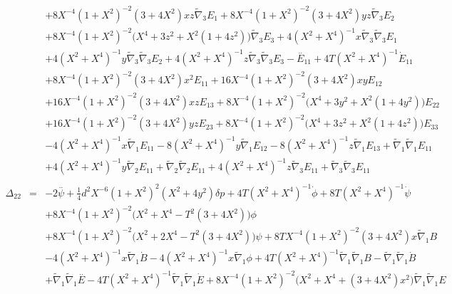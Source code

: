 \documentclass[10pt,letterpaper]{article}
\numberwithin{equation}{section}
\begin{document}
\begin{appendices}
\begin{eqnarray}
&& + 8 X^{-4} (1 + X^2)^{-2} (3 + 4 X^2) x z \tilde{\nabla}_{3}E_{1} + 8 X^{-4} (1 + X^2)^{-2} (3 + 4 X^2) y z \tilde{\nabla}_{3}E_{2} \nonumber \\ 
&& + 8 X^{-4} (1 + X^2)^{-2} \bigl(X^4 + 3 z^2 + X^2 (1 + 4 z^2)\bigr) \tilde{\nabla}_{3}E_{3} + 4 (X^2 + X^4)^{-1} x \tilde{\nabla}_{3}\tilde{\nabla}_{3}E_{1} \nonumber \\ 
&& + 4 (X^2 + X^4)^{-1} y \tilde{\nabla}_{3}\tilde{\nabla}_{3}E_{2} + 4 (X^2 + X^4)^{-1} z \tilde{\nabla}_{3}\tilde{\nabla}_{3}E_{3}- \overset{..}{E}_{11} + 4 T (X^2 + X^4)^{-1} \dot{E}_{11} \nonumber \\ 
&& + 8 X^{-4} (1 + X^2)^{-2} (3 + 4 X^2) x^2 E_{11} + 16 X^{-4} (1 + X^2)^{-2} (3 + 4 X^2) x y E_{12} \nonumber \\ 
&& + 16 X^{-4} (1 + X^2)^{-2} (3 + 4 X^2) x z E_{13} + 8 X^{-4} (1 + X^2)^{-2} \bigl(X^4 + 3 y^2 + X^2 (1 + 4 y^2)\bigr) E_{22} \nonumber \\ 
&& + 16 X^{-4} (1 + X^2)^{-2} (3 + 4 X^2) y z E_{23} + 8 X^{-4} (1 + X^2)^{-2} \bigl(X^4 + 3 z^2 + X^2 (1 + 4 z^2)\bigr) E_{33} \nonumber \\ 
&& - 4 (X^2 + X^4)^{-1} x \tilde{\nabla}_{1}E_{11} - 8 (X^2 + X^4)^{-1} y \tilde{\nabla}_{1}E_{12} - 8 (X^2 + X^4)^{-1} z \tilde{\nabla}_{1}E_{13} + \tilde{\nabla}_{1}\tilde{\nabla}_{1}E_{11} \nonumber \\ 
&& + 4 (X^2 + X^4)^{-1} y \tilde{\nabla}_{2}E_{11} + \tilde{\nabla}_{2}\tilde{\nabla}_{2}E_{11} + 4 (X^2 + X^4)^{-1} z \tilde{\nabla}_{3}E_{11} + \tilde{\nabla}_{3}\tilde{\nabla}_{3}E_{11}
\\  \nonumber\\ 
\Delta_{22}&=& -2 \overset{..}{\psi} + \tfrac{1}{4} d^2 X^{-6} (1 + X^2)^2 (X^2 + 4 y^2) \delta p + 4 T (X^2 + X^4)^{-1} \dot{\phi} + 8 T (X^2 + X^4)^{-1} \dot{\psi} \nonumber \\ 
&& + 8 X^{-4} (1 + X^2)^{-2} \bigl(X^2 + X^4 -  T^2 (3 + 4 X^2)\bigr) \phi \nonumber \\ 
&& + 8 X^{-4} (1 + X^2)^{-2} \bigl(X^2 + 2 X^4 -  T^2 (3 + 4 X^2)\bigr) \psi + 8 T X^{-4} (1 + X^2)^{-2} (3 + 4 X^2) x \tilde{\nabla}_{1}B \nonumber \\ 
&& - 4 (X^2 + X^4)^{-1} x \tilde{\nabla}_{1}\dot{B} - 4 (X^2 + X^4)^{-1} x \tilde{\nabla}_{1}\phi + 4 T (X^2 + X^4)^{-1} \tilde{\nabla}_{1}\tilde{\nabla}_{1}B -  \tilde{\nabla}_{1}\tilde{\nabla}_{1}\dot{B} \nonumber \\ 
&& + \tilde{\nabla}_{1}\tilde{\nabla}_{1}\overset{..}{E} - 4 T (X^2 + X^4)^{-1} \tilde{\nabla}_{1}\tilde{\nabla}_{1}\dot{E} + 8 X^{-4} (1 + X^2)^{-2} \bigl(X^2 + X^4 + (3 + 4 X^2) x^2\bigr) \tilde{\nabla}_{1}\tilde{\nabla}_{1}E \nonumber \\ 

\end{eqnarray}
\end{appendices}
\end{document}
